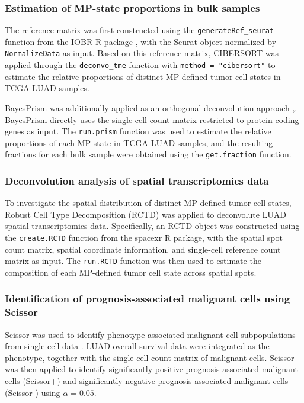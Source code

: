 \documentclass[pdflatex,sn-mathphys-num]{sn-jnl}%
\theoremstyle{thmstyleone}%
\theoremstyle{thmstyletwo}%
\theoremstyle{thmstylethree}%
\begin{document}
\subsubsection{Estimation of MP-state proportions in bulk samples}

The reference matrix was first constructed using the \texttt{generateRef\_seurat} function from the IOBR R package \cite{bib41}, with the Seurat object normalized by \texttt{NormalizeData} as input. Based on this reference matrix, CIBERSORT was applied through the \texttt{deconvo\_tme} function with \texttt{method = "cibersort"} to estimate the relative proportions of distinct MP-defined tumor cell states in TCGA-LUAD samples.

BayesPrism was additionally applied as an orthogonal deconvolution approach \cite{bib42},. BayesPrism directly uses the single-cell count matrix restricted to protein-coding genes as input. The \texttt{run.prism} function was used to estimate the relative proportions of each MP state in TCGA-LUAD samples, and the resulting fractions for each bulk sample were obtained using the \texttt{get.fraction} function.

\subsubsection{Deconvolution analysis of spatial transcriptomics data}

To investigate the spatial distribution of distinct MP-defined tumor cell states, Robust Cell Type Decomposition (RCTD) \cite{bib43} was applied to deconvolute LUAD spatial transcriptomics data. Specifically, an RCTD object was constructed using the \texttt{create.RCTD} function from the spacexr R package, with the spatial spot count matrix, spatial coordinate information, and single-cell reference count matrix as input. The \texttt{run.RCTD} function was then used to estimate the composition of each MP-defined tumor cell state across spatial spots.

\subsubsection{Identification of prognosis-associated malignant cells using Scissor}

Scissor was used to identify phenotype-associated malignant cell subpopulations from single-cell data \cite{bib44}. LUAD overall survival data were integrated as the phenotype, together with the single-cell count matrix of malignant cells. Scissor was then applied to identify significantly positive prognosis-associated malignant cells (Scissor+) and significantly negative prognosis-associated malignant cells (Scissor-) using \(\alpha = 0.05\).
\end{document}
